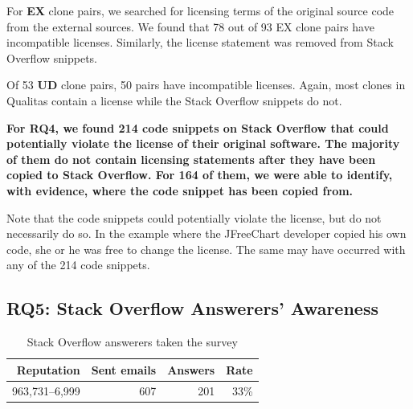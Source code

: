 \documentclass[10pt,journal,compsoc]{IEEEtran}
\begin{document}
For \textbf{EX}
clone pairs, we searched for licensing terms of the original source code from
the external sources. We found that 78 out of 93 EX clone pairs have
incompatible licenses. %
Similarly, the license statement was removed from Stack Overflow snippets. 

Of 53 \textbf{UD} clone pairs, 50 pairs have incompatible licenses. Again, most
clones in Qualitas contain a license while the Stack Overflow snippets do not.
%

\textbf{For RQ4, we found 214 code snippets on Stack Overflow that
	could potentially violate the license of their original software. The majority of them
	do not contain licensing statements after they have been copied to
	Stack Overflow. For 164 of them, we were able to identify,
        with evidence, where the code snippet has been copied from.}

Note that the code snippets could potentially violate the license, but do
not necessarily do so. In the example where the JFreeChart
developer copied his own code, she or he was free to change the
license. The same may have occurred with any of the 214 code
snippets.

\subsection{RQ5: Stack Overflow Answerers' Awareness}

\begin{table}
	\centering
	\caption{Stack Overflow answerers taken the survey}
	\label{tab:survey_target}
	\begin{tabular}{rrrr}
		\toprule
		Reputation & Sent emails & Answers & Rate \\
		\midrule
		963,731--6,999 & 607 & 201 & 33\% \\
		\bottomrule
	\end{tabular}
\end{table}
\end{document}
